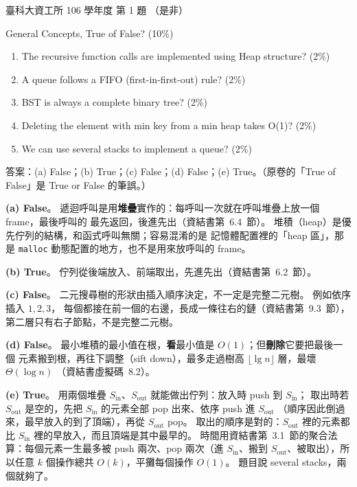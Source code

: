 \begin{pastexam}[label={px:ntust-106-ice-01}]{臺科大資工所 106 學年度 第 1 題}
（是非）

General Concepts, True of False? (10\%)
\begin{enumerate}[label=(\alph*)]
\item The recursive function calls are implemented using Heap structure? (2\%)
\item A queue follows a FIFO (first-in-first-out) rule? (2\%)
\item BST is always a complete binary tree? (2\%)
\item Deleting the element with min key from a min heap takes O(1)? (2\%)
\item We can use several stacks to implement a queue? (2\%)
\end{enumerate}
\end{pastexam}

\begin{pastsoln}
答案：(a) False；(b) True；(c) False；(d) False；(e) True。（原卷的「True of False」是 True or False
的筆誤。）

\textbf{(a) False}。 遞迴呼叫是用\textbf{堆疊}實作的：每呼叫一次就在呼叫堆疊上放一個 frame，最後呼叫的
最先返回，後進先出（資結書第~6.4~節）。 堆積（heap）是優先佇列的結構，和函式呼叫無關；容易混淆的是
記憶體配置裡的「heap 區」，那是 \texttt{malloc} 動態配置的地方，也不是用來放呼叫的 frame。

\textbf{(b) True}。 佇列從後端放入、前端取出，先進先出（資結書第~6.2~節）。

\textbf{(c) False}。 二元搜尋樹的形狀由插入順序決定，不一定是完整二元樹。 例如依序插入 $1, 2, 3$，
每個都接在前一個的右邊，長成一條往右的鏈（資結書第~9.3~節），第二層只有右子節點，不是完整二元樹。

\textbf{(d) False}。 最小堆積的最小值在根，\textbf{看}最小值是 $O(1)$；但\textbf{刪除}它要把最後一個
元素搬到根，再往下調整（sift down），最多走過樹高 $\lfloor \lg n \rfloor$ 層，最壞 $\Theta(\log n)$
（資結書虛擬碼~8.2）。

\textbf{(e) True}。 用兩個堆疊 $S_{\mathrm{in}}$、$S_{\mathrm{out}}$ 就能做出佇列：放入時 push 到 $S_{\mathrm{in}}$；
取出時若 $S_{\mathrm{out}}$ 是空的，先把 $S_{\mathrm{in}}$ 的元素全部 pop 出來、依序 push 進 $S_{\mathrm{out}}$
（順序因此倒過來，最早放入的到了頂端），再從 $S_{\mathrm{out}}$ pop。 取出的順序是對的：$S_{\mathrm{out}}$ 裡的元素都比 $S_{\mathrm{in}}$ 裡的早放入，而且頂端是其中最早的。
時間用資結書第~3.1~節的聚合法算：每個元素一生最多被 push 兩次、pop 兩次（進 $S_{\mathrm{in}}$、搬到
$S_{\mathrm{out}}$、被取出），所以任意 $k$ 個操作總共 $O(k)$，平攤每個操作 $O(1)$。 題目說
several stacks，兩個就夠了。
\end{pastsoln}
